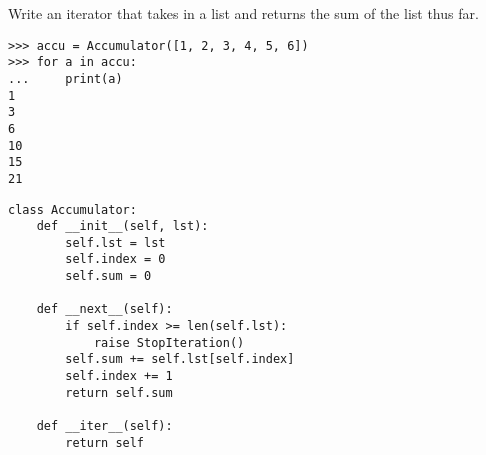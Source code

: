 \begin{blocksection}
\question Write an iterator that takes in a list and returns the sum of the list thus far.

\begin{lstlisting}
>>> accu = Accumulator([1, 2, 3, 4, 5, 6])
>>> for a in accu:
...     print(a)
1
3
6
10
15
21
\end{lstlisting}

\begin{solution}[1.5in]
\begin{lstlisting}
class Accumulator:
    def __init__(self, lst):
        self.lst = lst
        self.index = 0
        self.sum = 0

    def __next__(self):
        if self.index >= len(self.lst):
            raise StopIteration()
        self.sum += self.lst[self.index]
        self.index += 1
        return self.sum

    def __iter__(self):
        return self
\end{lstlisting}
\end{solution}
\end{blocksection}
